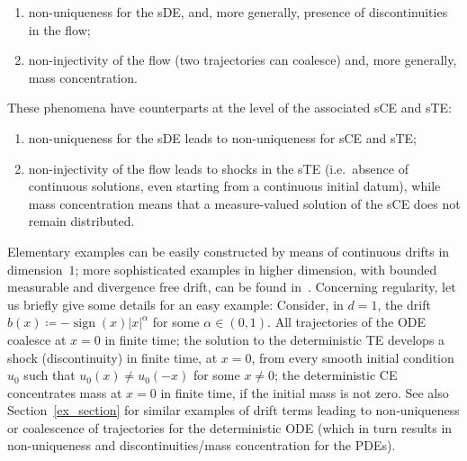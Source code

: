 \documentclass[a4paper,10pt]{article}
\newcommand\1{\mathbbm{1}}
\DeclareMathOperator{\sign}{sign}
\numberwithin{equation}{section}
\begin{document}
\begin{enumerate}
  \item[1)] non-uniqueness for the sDE, and, more generally, presence of discontinuities in the flow;
  \item[2)] non-injectivity of the flow (two trajectories can coalesce) and, more generally, mass concentration.
\end{enumerate}
These phenomena have counterparts at the level of the associated sCE and sTE:
\begin{enumerate}
  \item[1)]  non-uniqueness for the sDE leads to non-uniqueness for sCE and sTE;
  \item[2)]  non-injectivity of the flow leads to shocks in the sTE (i.e.~absence of continuous solutions, even starting from a continuous initial datum), while mass concentration means that a measure-valued solution of the sCE does not remain distributed.
\end{enumerate}
Elementary examples can be easily constructed by means of continuous drifts in dimension~$1$; more sophisticated examples in higher dimension, with bounded measurable and divergence free drift, can be found in~\cite{AIZENMAN78}. Concerning regularity, let us briefly give some details for an easy example: Consider, in $d=1$, the drift $b(x) \coloneqq - \sign(x) \vert x \vert^{\alpha }$ for some $\alpha \in (0,1)$. All trajectories of the ODE coalesce at $x=0$ in finite time; the solution to the deterministic TE develops a shock (discontinuity) in finite time, at $x=0$, from every smooth initial condition $u_{0}$ such that $u_{0}( x) \neq u_{0}( -x) $ for some $x\neq 0$; the deterministic CE concentrates mass at $x=0$ in finite time, if the initial mass is not zero. See also Section~\ref{ex_section} for similar examples of drift terms leading to non-uniqueness or coalescence of trajectories for the deterministic ODE (which in turn results in non-uniqueness and discontinuities/mass concentration for the PDEs).
\end{document}
